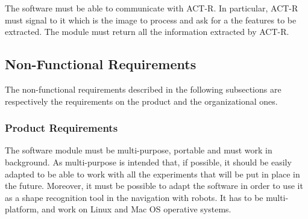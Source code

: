 		The software must be able to communicate with ACT-R. 
		In particular, ACT-R must signal to it which is the image to process and ask for a the features to be extracted. The module must return all the information extracted by ACT-R.

		\subsection{Non-Functional Requirements}
		The non-functional requirements described in the following subsections are respectively the requirements on the product and the organizational ones.

			\subsubsection{Product Requirements}
			The software module must be multi-purpose, portable and must work in background.
			As multi-purpose is intended that, if possible, it should be easily adapted to be able to work with all the experiments that will be put in place in the future. Moreover, it must be possible to adapt the software in order to use it as a shape recognition tool in the navigation with robots. %
			It has to be multi-platform, and work on Linux and Mac OS operative systems.
	

